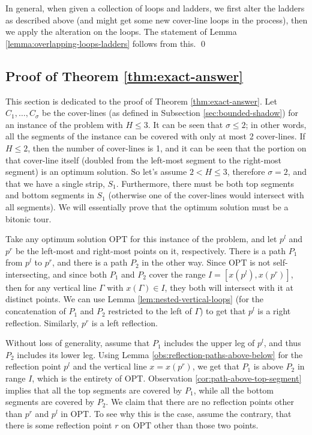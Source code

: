 \documentclass[pdflatex,sn-mathphys-num]{sn-jnl}
\theoremstyle{thmstyleone}
\newcommand{\OPT}{{\text{OPT}}}
\begin{document}
    In general, when given a collection of loops and ladders, we first alter the ladders as described above (and might get some new cover-line loops in the process), then we apply the alteration on the loops. The statement of Lemma \ref{lemma:overlapping-loops-ladders} follows from this. \qed

\subsection{Proof of Theorem \ref{thm:exact-answer}}\label{sec:exact-answer}
    This section is dedicated to the proof of Theorem \ref{thm:exact-answer}.
    Let $ C_1,\dots, C_\sigma $ be the cover-lines (as defined in Subsection \ref{sec:bounded-shadow}) for an instance of the problem with $ H\le 3 $. It can be seen that $ \sigma \le 2 $; in other words, all the segments of the instance can be covered with only at most 2 cover-lines. If $ H \le 2 $, then the number of cover-lines is 1, and it can be seen that the portion on that cover-line itself (doubled from the left-most segment to the right-most segment) is an optimum solution. So let's assume $ 2 < H \le 3 $, therefore $ \sigma = 2 $, and that we have a single strip, $ S_1 $. Furthermore, there must be both top segments and bottom segments in $ S_1 $ (otherwise one of the cover-lines would intersect with all segments). We will essentially prove that the optimum solution must be a bitonic tour.
	
	Take any optimum solution $ \OPT $ for this instance of the problem, and let $ p^l $ and $ p^r $ be the left-most and right-most points on it, respectively. There is a path $ P_1 $ from $ p^l $ to $ p^r $, and there is a path $ P_2 $ in the other way. Since $ \OPT $ is not self-intersecting, and since both $ P_1 $ and $ P_2 $ cover the range $ I = [x(p^l), x(p^r)] $, then for any vertical line $ \Gamma $ with $ x(\Gamma) \in I $, they both will intersect with it at distinct points. 
	We can use Lemma \ref{lem:nested-vertical-loops} (for the concatenation of $ P_1 $ and $ P_2 $ restricted to the left of $ \Gamma $) to get that $ p^l $ is a right reflection. Similarly, $ p^r $ is a left reflection. 
	
	Without loss of generality, assume that $ P_1 $ includes the upper leg of $ p^l $, and thus $ P_2 $ includes its lower leg. Using Lemma \ref{obs:reflection-paths-above-below} for the reflection point $ p^l $ and the vertical line $ x = x(p^r) $, we get that $ P_1 $ is above $ P_2 $ in range $ I $, which is the entirety of $ \OPT $.
	Observation \ref{cor:path-above-top-segment} implies that all the top segments are covered by $ P_1 $, while all the bottom segments are covered by $ P_2 $.
	We claim that there are no reflection points other than $ p^r $ and $ p^l $ in $ \OPT $. To see why this is the case, assume the contrary, that there is some reflection point $ r $ on $ \OPT $ other than those two points.
	
\end{document}
